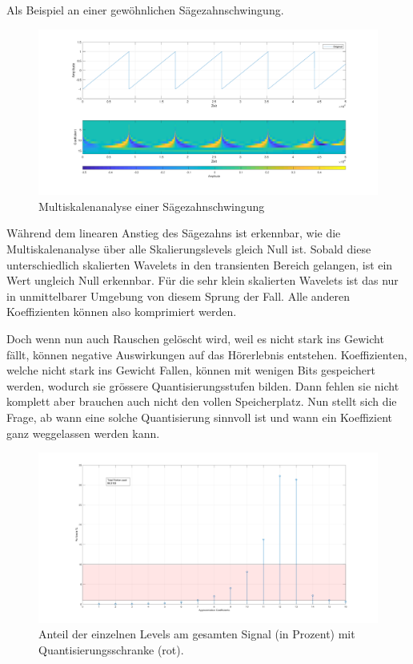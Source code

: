 \begin{refsection}
Als Beispiel an einer gewöhnlichen Sägezahnschwingung.
\begin{figure}
	\centering
	\includegraphics[width=\linewidth]{papers/compress/Bilder/sawtooth}
	\caption{Multiskalenanalyse einer Sägezahnschwingung}
	\label{fig:sawtooth}
\end{figure}

Während dem linearen Anstieg des Sägezahns ist erkennbar, wie die Multiskalenanalyse über alle Skalierungslevels gleich Null ist.
Sobald diese unterschiedlich skalierten Wavelets in den transienten Bereich gelangen, ist ein Wert ungleich Null erkennbar.
Für die sehr klein skalierten Wavelets ist das nur in unmittelbarer Umgebung von diesem Sprung der Fall.
Alle anderen Koeffizienten können also komprimiert werden.

Doch wenn nun auch Rauschen gelöscht wird, weil es nicht stark ins Gewicht fällt, können negative Auswirkungen auf das Hörerlebnis entstehen. 
Koeffizienten, welche nicht stark ins Gewicht Fallen, können mit wenigen Bits gespeichert werden, wodurch sie grössere Quantisierungsstufen bilden. 
Dann fehlen sie nicht komplett aber brauchen auch nicht den vollen Speicherplatz.
Nun stellt sich die Frage, ab wann eine solche Quantisierung sinnvoll ist und wann ein Koeffizient ganz weggelassen werden kann. 

\begin{figure}
	\centering
	\includegraphics[width=\linewidth]{papers/compress/Bilder/recCoefs}
	\caption{Anteil der einzelnen Levels am gesamten Signal (in Prozent) mit Quantisierungsschranke (rot).}
	\label{fig:coefficients}
\end{figure} 


\end{refsection}
